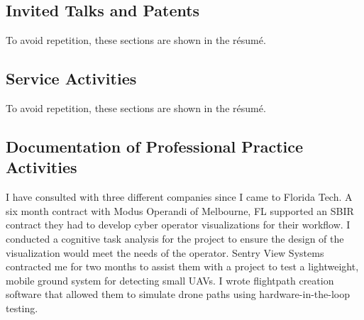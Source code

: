 \documentclass[12pt,letterpaper]{report}
\begin{document}
  

\subsection*{Invited Talks and Patents}

To avoid repetition, these sections are shown in the résumé.  




\newpage
\subsection*{Service Activities}
To avoid repetition, these sections are shown in the résumé.

\subsection*{Documentation of Professional Practice Activities}

I have consulted with three different companies since I came to Florida Tech.   A six month contract with Modus Operandi of Melbourne, FL supported an SBIR contract they had to develop cyber operator visualizations for their workflow.  I conducted a cognitive task analysis for the project to ensure the design of the visualization would meet the needs of the operator.  Sentry View Systems contracted me for two months to assist them with a project to test a lightweight, mobile ground system for detecting small UAVs.  I wrote flightpath creation software that allowed them to simulate drone paths using hardware-in-the-loop testing.  
\end{document}
